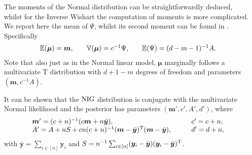 The moments of the Normal distribution can be straightforwardly deduced, whilst for the Inverse Wishart the computation of moments is more complicated. We report here the mean of $\Psi$, whilst its second moment can be found in \citet{Siskind1972}. Specifically
\begin{equation*}
\begin{array}{lclcl}
\mathbb{E}(\bm{\mu})=\bm{m},&&\mathbb{V}(\bm{\mu})=c^{-1}\Psi,
&&
\mathbb{E}(\Psi)=(d-m-1)^{-1}A.
\end{array}
\end{equation*}
Note that also just as in the Normal linear model, $\bm{\mu}$ marginally follows a multivariate T distribution with $d+1-m$ degrees of freedom and parameters $(\bm{m},  c^{-1}A)$.

It can be shown that the $\textnormal{NIG}$ distribution is conjugate with the multivariate Normal likelihood and the posterior has parameters $(\bm{m}',c',A',d')$, where
\begin{equation*}
\begin{array}{lccl}
\bm{m}'=(c+n)^{-1}(c\bm{m}+n\bar{\bm{y}}), &&& c'=c+n,\\
A'=A+nS+cn(c+n)^{-1}(\bm{m}-\bar{\bm{y}})^{\textnormal{T}}(\bm{m}-\bar{\bm{y}}),&&&d'=d+n,
\end{array}
\end{equation*}
with $\bar{\bm{y}}=\sum_{i\in[n]}\bm{y}_i$ and $S=n^{-1}\sum_{i\in[n]}(\bm{y}_i-\bar{\bm{y}})(\bm{y}_i-\bar{\bm{y}})^{\textnormal{T}}$.